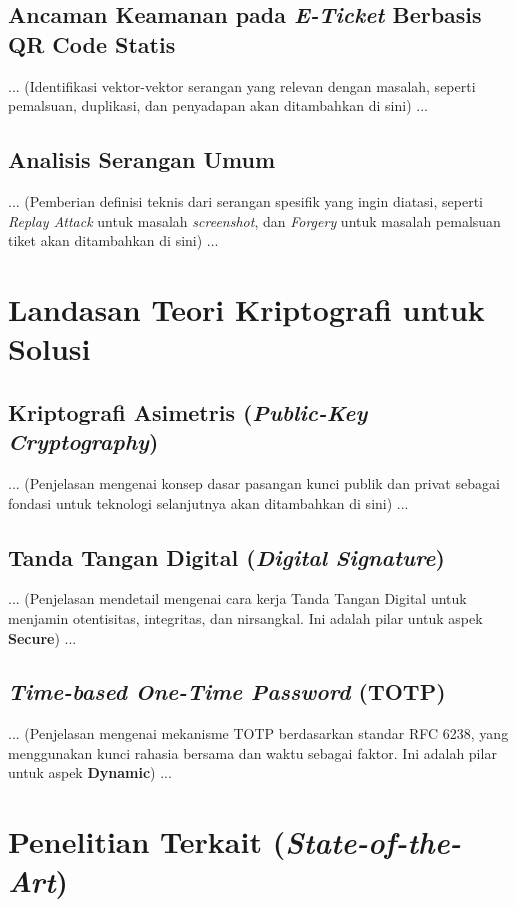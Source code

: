 \subsection{Ancaman Keamanan pada \textit{E-Ticket} Berbasis QR Code Statis}
... (Identifikasi vektor-vektor serangan yang relevan dengan masalah, seperti pemalsuan, duplikasi, dan penyadapan akan ditambahkan di sini) ...

\subsection{Analisis Serangan Umum}
... (Pemberian definisi teknis dari serangan spesifik yang ingin diatasi, seperti \textit{Replay Attack} untuk masalah \textit{screenshot}, dan \textit{Forgery} untuk masalah pemalsuan tiket akan ditambahkan di sini) ...

\section{Landasan Teori Kriptografi untuk Solusi}
\subsection{Kriptografi Asimetris (\textit{Public-Key Cryptography})}
... (Penjelasan mengenai konsep dasar pasangan kunci publik dan privat sebagai fondasi untuk teknologi selanjutnya akan ditambahkan di sini) ...

\subsection{Tanda Tangan Digital (\textit{Digital Signature})}
... (Penjelasan mendetail mengenai cara kerja Tanda Tangan Digital untuk menjamin otentisitas, integritas, dan nirsangkal. Ini adalah pilar untuk aspek \textbf{Secure}) ...

\subsection{\textit{Time-based One-Time Password} (TOTP)}
... (Penjelasan mengenai mekanisme TOTP berdasarkan standar RFC 6238, yang menggunakan kunci rahasia bersama dan waktu sebagai faktor. Ini adalah pilar untuk aspek \textbf{Dynamic}) ...

\section{Penelitian Terkait (\textit{State-of-the-Art})}
